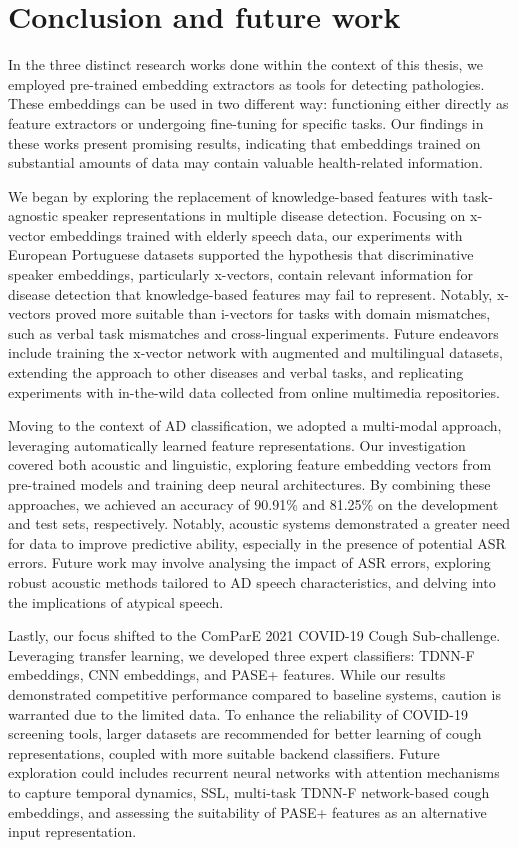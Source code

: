 \section{Conclusion and future work}
In the three distinct research works done within the context of this thesis, we employed pre-trained embedding extractors as tools for detecting pathologies. These embeddings can be used in two different way: functioning either directly as feature extractors or undergoing fine-tuning for specific tasks. Our findings in these works present promising results, indicating that embeddings trained on substantial amounts of data may contain valuable health-related information.

We began by exploring the replacement of knowledge-based features with task-agnostic speaker representations in multiple disease detection. Focusing on x-vector embeddings trained with elderly speech data, our experiments with European Portuguese datasets supported the hypothesis that discriminative speaker embeddings, particularly x-vectors, contain relevant information for disease detection that knowledge-based features may fail to represent. Notably, x-vectors proved more suitable than i-vectors for tasks with domain mismatches, such as verbal task mismatches and cross-lingual experiments. Future endeavors include training the x-vector network with augmented and multilingual datasets, extending the approach to other diseases and verbal tasks, and replicating experiments with in-the-wild data collected from online multimedia repositories.

Moving to the context of AD classification, we adopted a multi-modal approach, leveraging automatically learned feature representations. Our investigation covered both acoustic and linguistic, exploring feature embedding vectors from pre-trained models and training deep neural architectures. By combining these approaches, we achieved an accuracy of 90.91\% and 81.25\% on the development and test sets, respectively. Notably, acoustic systems demonstrated a greater need for data to improve predictive ability, especially in the presence of potential ASR errors. Future work may involve analysing the impact of ASR errors, exploring robust acoustic methods tailored to AD speech characteristics, and delving into the implications of atypical speech.

Lastly, our focus shifted to the ComParE 2021 COVID-19 Cough Sub-challenge. Leveraging transfer learning, we developed three expert classifiers: TDNN-F embeddings, CNN embeddings, and PASE+ features. While our results demonstrated competitive performance compared to baseline systems, caution is warranted due to the limited data. To enhance the reliability of COVID-19 screening tools, larger datasets are recommended for better learning of cough representations, coupled with more suitable backend classifiers. Future exploration could includes recurrent neural networks with attention mechanisms to capture temporal dynamics, SSL, multi-task TDNN-F network-based cough embeddings, and assessing the suitability of PASE+ features as an alternative input representation.

